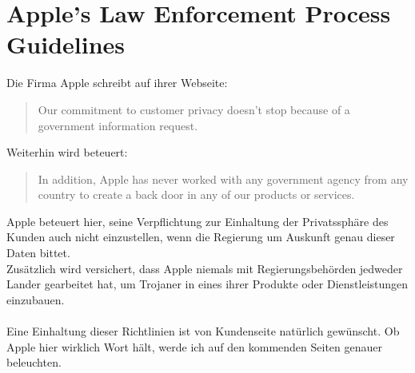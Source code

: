 \section{Apple's Law Enforcement Process Guidelines}
	Die Firma Apple schreibt auf ihrer Webseite:
	\begin{quote}
	Our commitment to customer privacy doesn't stop because of a government
	information request.
	\end{quote}
	Weiterhin wird beteuert: 
	\begin{quote}
	In addition, Apple has never worked with any government agency from any country to create a back 
	door in any of our products or services.
	\end{quote}
	Apple beteuert hier, seine Verpflichtung zur Einhaltung der Privatssphäre des
	Kunden auch nicht einzustellen, wenn die Regierung um Auskunft genau dieser
	Daten bittet.\\
	Zusätzlich wird versichert, dass Apple niemals mit Regierungsbehörden
	jedweder Lander gearbeitet hat, um Trojaner in eines ihrer Produkte oder
	Dienstleistungen einzubauen.\\\\
	Eine Einhaltung dieser Richtlinien ist von Kundenseite natürlich gewünscht.
	Ob Apple hier wirklich Wort hält, werde ich auf den kommenden Seiten genauer
	beleuchten.
